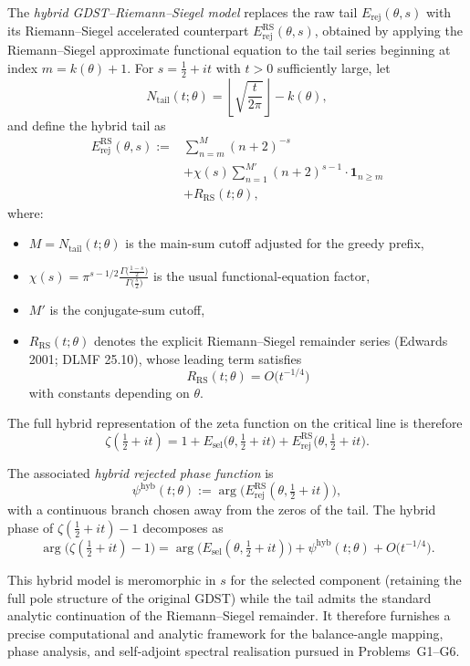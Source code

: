 The \emph{hybrid GDST--Riemann--Siegel model} replaces the raw tail \(E_{\mathrm{rej}}(\theta,s)\) with its Riemann--Siegel accelerated counterpart \(E_{\mathrm{rej}}^{\mathrm{RS}}(\theta,s)\), obtained by applying the Riemann--Siegel approximate functional equation to the tail series beginning at index \(m = k(\theta)+1\). For \(s = \frac12 + it\) with \(t > 0\) sufficiently large, let
\[
N_{\mathrm{tail}}(t;\theta) = \left\lfloor \sqrt{\frac{t}{2\pi}} \right\rfloor - k(\theta),
\]
and define the hybrid tail as
\begin{equation}
\begin{aligned}
E_{\mathrm{rej}}^{\mathrm{RS}}(\theta,s) :={}& \sum_{n=m}^{M} (n+2)^{-s} \\
&+ \chi(s) \sum_{n=1}^{M'} (n+2)^{s-1} \cdot \mathbf{1}_{n \ge m} \\
&+ R_{\mathrm{RS}}(t;\theta),
\end{aligned}
\end{equation}
where:
\begin{itemize}
\item \(M = N_{\mathrm{tail}}(t;\theta)\) is the main-sum cutoff adjusted for the greedy prefix,
\item \(\chi(s) = \pi^{s-1/2} \frac{\Gamma\bigl(\frac{1-s}{2}\bigr)}{\Gamma\bigl(\frac{s}{2}\bigr)}\) is the usual functional-equation factor,
\item \(M'\) is the conjugate-sum cutoff,
\item \(R_{\mathrm{RS}}(t;\theta)\) denotes the explicit Riemann--Siegel remainder series (Edwards 2001; DLMF 25.10), whose leading term satisfies
\[
R_{\mathrm{RS}}(t;\theta) = O\bigl(t^{-1/4}\bigr)
\]
with constants depending on \(\theta\).
\end{itemize}

The full hybrid representation of the zeta function on the critical line is therefore
\begin{equation}
\zeta\!\left(\tfrac12 + it\right) = 1 + E_{\mathrm{sel}}\!\bigl(\theta,\tfrac12 + it\bigr) + E_{\mathrm{rej}}^{\mathrm{RS}}\!\bigl(\theta,\tfrac12 + it\bigr).
\end{equation}

The associated \emph{hybrid rejected phase function} is
\begin{equation}
\psi^{\mathrm{hyb}}(t;\theta) := \arg \bigl( E_{\mathrm{rej}}^{\mathrm{RS}}(\theta,\tfrac12 + it) \bigr),
\end{equation}
with a continuous branch chosen away from the zeros of the tail. The hybrid phase of \(\zeta(\tfrac12 + it) - 1\) decomposes as
\begin{equation}
\arg\bigl(\zeta(\tfrac12 + it) - 1\bigr) = \arg\bigl(E_{\mathrm{sel}}(\theta,\tfrac12 + it)\bigr) + \psi^{\mathrm{hyb}}(t;\theta) + O\bigl(t^{-1/4}\bigr).
\end{equation}

This hybrid model is meromorphic in \(s\) for the selected component (retaining the full pole structure of the original GDST) while the tail admits the standard analytic continuation of the Riemann--Siegel remainder. It therefore furnishes a precise computational and analytic framework for the balance-angle mapping, phase analysis, and self-adjoint spectral realisation pursued in Problems~G1--G6.